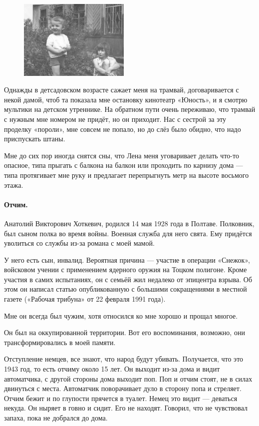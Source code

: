 \documentclass{book}
\begin{document}
\begin{figure}
\vskip-4mm
\centering
\includegraphics[width=53mm,angle=0]{pics/tosha-lena-dacha}
\vskip-4mm
\end{figure}

Однажды в детсадовском возрасте сажает меня на трамвай,
договаривается с некой дамой, чтоб та показала мне остановку кинотеатр «Юность», 
и я смотрю мультики на детском утреннике.
На обратном пути очень переживаю, что трамвай с нужным мне номером не придёт, но он приходит.
Нас с сестрой за эту проделку «пороли», мне совсем не попало, но до слёз было обидно, что надо приспускать штаны.

Мне до сих пор иногда снятся сны, что Лена меня уговаривает делать что-то опасное, типа прыгать с балкона на балкон или проходить по карнизу дома --- типа протягивает мне руку и предлагает перепрыгнуть метр на высоте восьмого этажа.

\paragraph{Отчим.}
Анатолий Викторович Хоткевич, родился 14 мая 1928 года в Полтаве.
Полковник, был сыном полка во время войны.
Военная служба для него свята.
Ему придётся уволиться со службы из-за романа с моей мамой.

У него есть сын, инвалид.
Вероятная причина --- участие в операции «Снежок», войсковом учении с применением ядерного оружия на Тоцком полигоне.
Кроме участия в самих испытаниях, он с семьёй жил недалеко от эпицентра взрыва.
Об этом он написал статью опубликованную с большими сокращениями в местной газете («Рабочая трибуна» от 22 февраля 1991 года).

Мне он всегда был чужим, хотя относился ко мне хорошо и прощал многое.

Он был на оккупированной территории.
Вот его воспоминания, возможно, они трансформировались в моей памяти.

Отступление немцев, все знают, что народ будут убивать.
Получается, что это 1943 год, то есть отчиму около 15 лет.
Он выходит из-за дома и видит автоматчика, с другой стороны дома выходит поп.
Поп и отчим стоят, не в силах двинуться с места.
Автоматчик поворачивает дуло в сторону попа и стреляет.
Отчим бежит и по глупости прячется в туалет.
Немец это видит --- деваться некуда.
Он ныряет в говно и сидит. 
Его не находят.
Говорил, что не чувствовал запаха, пока не добрался до дома.
\end{document}
